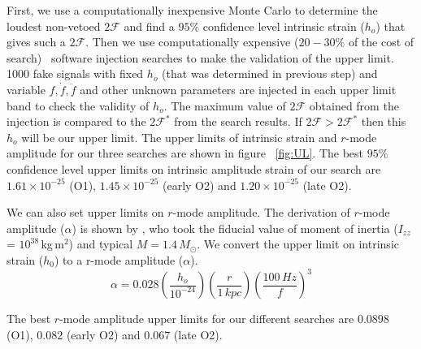 \documentclass{ttuthes2007}
\begin{document}
First, we use a computationally inexpensive Monte Carlo to determine the loudest
non-vetoed $2\mathcal{F}$ and find a $95\%$ confidence level intrinsic strain
($h_o$) that gives such a $2\mathcal{F}$. Then we use computationally expensive
($20- 30\%$ of the cost of search)~\cite{Aasi_2015} software injection searches
to make the validation of the upper limit. 1000 fake signals with fixed $h_o$
(that was determined in previous step) and variable $f,\dot{f},\ddot{f}$ and
other unknown parameters are injected in each upper limit band to check the
validity of $h_o$. The maximum value of $2\mathcal{F}$ obtained from the
injection is compared to the $2\mathcal{F}^*$ from the search results. If
$2\mathcal{F}> 2\mathcal{F}^*$ then this $h_o$ will be our upper limit.  The
upper limits of intrinsic strain and $r$-mode amplitude for our three searches
are
shown in figure ~\ref{fig:UL}.  The best $95\%$ confidence level upper limits on
intrinsic amplitude strain of our search are $1.61\times 10^{-25}$ (O1),
$1.45\times 10^{-25}$ (early O2) and $1.20\times 10^{-25}$ (late O2).

We can also set upper limits on $r$-mode amplitude.  
The derivation of $r$-mode amplitude ($\alpha$) is shown by \citet{Owen_2010},
who took the fiducial value of moment of inertia ($I_{zz}$ = $10^{38}$\,kg\,m$^2$)
and typical $M=1.4\,M_\odot$. We convert the upper limit on
intrinsic strain ($h_0$) to a r-mode amplitude ($\alpha$).   
\begin{equation} 
\alpha
=0.028\left(\frac{h_o}{10^{-24}}\right)\left(\frac{r}{1\,kpc}\right)\left(\frac{100\,Hz}{f}\right)^3
\end{equation} 

The best $r$-mode amplitude upper limits for our different searches are $0.0898$
(O1), $0.082$ (early O2) and $0.067$ (late O2). 
\end{document}
